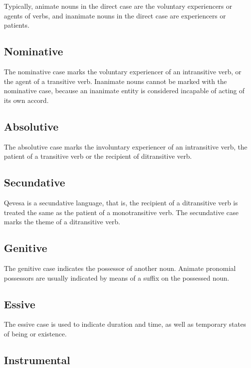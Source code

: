 \documentclass[grammar]{subfiles}
\begin{document}
Typically, animate nouns in the direct case are the voluntary experiencers or
agents of verbs, and inanimate nouns in the direct case are experiencers or
patients. 


\subsection{Nominative}
\label{ssec:ns_nominative_case}

The nominative case marks the voluntary experiencer of an intransitive verb, or
the agent of a transitive verb.  Inanimate nouns cannot be marked with the
nominative case, because an inanimate entity is considered incapable of acting
of its own accord. 


\subsection{Absolutive}
\label{ssec:ns_absolutive_case}

The absolutive case marks the involuntary experiencer of an intransitive verb,
the patient of a transitive verb or the recipient of ditransitive verb.


\subsection{Secundative}
\label{ssec:ns_secundative_case}

Qevesa is a secundative language, that is, the recipient of a ditransitive verb
is treated the same as the patient of a monotransitive verb. The secundative
case marks the theme of a ditransitive verb.


\subsection{Genitive}
\label{ssec:ns_genitive_case}

The genitive case indicates the possessor of another noun.  Animate pronomial
possessors are usually indicated by means of a suffix on the possessed noun.


\subsection{Essive}
\label{ssec:ns_essive_case}

The essive case is used to indicate duration and time, as well as temporary
states of being or existence.  


\subsection{Instrumental}
\label{ssec:ns_instrumental_case}
\end{document}
